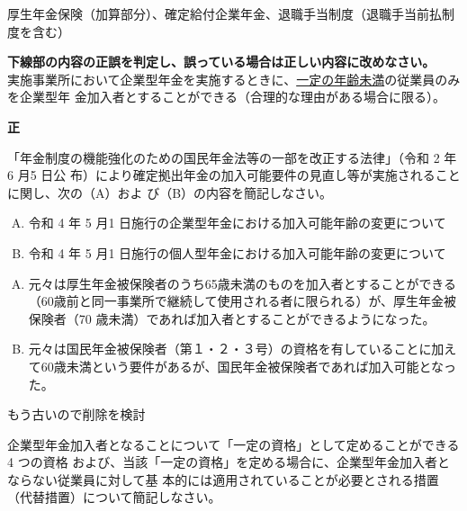\begin{answerbox}
  厚生年金保険（加算部分）、確定給付企業年金、退職手当制度（退職手当前払制度を含む）
\end{answerbox}

\begin{truefalse}[年金1 H29 問題1(4)\textcircled{1}]
  \textbf{下線部の内容の正誤を判定し、誤っている場合は正しい内容に改めなさい。}
\\  

実施事業所において企業型年金を実施するときに、\underline{一定の年齢未満}の従業員のみを企業型年
金加入者とすることができる（合理的な理由がある場合に限る）。
\end{truefalse}

\begin{answerbox}
  \textbf{正}
\end{answerbox}

\begin{shortanswer}[年金1 2020 問題2(2)\textcircled{3}]
「年金制度の機能強化のための国民年金法等の一部を改正する法律」（令和 2 年6 月5 日公
布）により確定拠出年金の加入可能要件の見直し等が実施されることに関し、次の（A）およ
び（B）の内容を簡記しなさい。
\begin{enumerate}[(A)]
  \item 令和 4 年 5 月1 日施行の企業型年金における加入可能年齢の変更について
  \item 令和 4 年 5 月1 日施行の個人型年金における加入可能年齢の変更について
\end{enumerate}
\end{shortanswer}

\begin{answerbox}
  \begin{enumerate}[(A)]
  \item 元々は厚生年金被保険者のうち65歳未満のものを加入者とすることができる（60歳前と同一事業所で継続して使用される者に限られる）が、厚生年金被保険者（70 歳未満）であれば加入者とすることができるようになった。
  \item 元々は国民年金被保険者（第１・２・３号）の資格を有していることに加えて60歳未満という要件があるが、国民年金被保険者であれば加入可能となった。
\end{enumerate}
\end{answerbox}

\begin{explanationbox}
  もう古いので削除を検討
\end{explanationbox}

\begin{shortanswer}[年金1 2019 問題2(4)\textcircled{1}]
  企業型年金加入者となることについて「一定の資格」として定めることができる4 つの資格
および、当該「一定の資格」を定める場合に、企業型年金加入者とならない従業員に対して基
本的には適用されていることが必要とされる措置（代替措置）について簡記しなさい。
\end{shortanswer}

